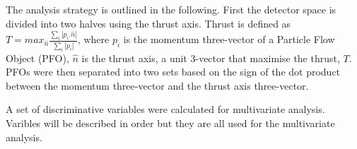 \documentclass[a4paper,11pt]{article}
\begin{document}

The analysis strategy is outlined in the following. First the detector space is divided into two halves using the thrust axis. Thrust is defined as 
$T = max_{\hat{n}} \frac {\sum_i \left| p_i . \hat{n} \right|}{\sum_i \left| p_i \right|}$, where  $p_i$ is the momentum three-vector of a Particle Flow Object (PFO), $\hat{n}$ is the thrust axis, a unit 3-vector that maximise the thrust, $T$. PFOs were then separated into two sets based on the sign of the dot product between the momentum three-vector and the thrust axis three-vector.


A set of discriminative variables were calculated for multivariate analysis.  Varibles will be described in order but they are all used for the multivariate analysis.
\end{document}
